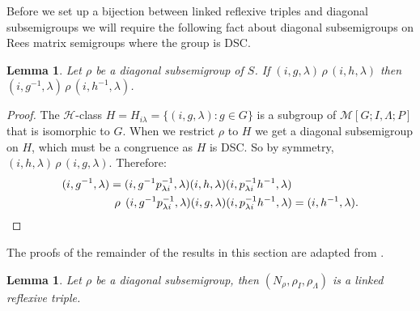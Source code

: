 \documentclass[a4paper, 12pt,reqno]{amsart}
\theoremstyle{plain}
\newtheorem{lemma}[thm]{Lemma}
\theoremstyle{definition}
\theoremstyle{remark}
\newcommand{\RM}{\mathcal{M}[G;I,\Lambda;P]}
\newcommand{\normspace}[1]{\, #1 \,}
\newcommand{\bigspace}[1]{\hspace{4.5pt} #1 \hspace{4.5pt}}
\begin{document}
Before we set up a bijection between linked reflexive triples and diagonal subsemigroups we will require the following fact about diagonal subsemigroups on Rees matrix semigroups where the group is DSC.

\begin{lemma}
    \label{Use of DSC}
    Let $\rho$ be a diagonal subsemigroup of $S$.
    If $(i,g,\lambda) \normspace{\rho} (i,h,\lambda)$ then $(i,g^{-1},\lambda) \normspace{\rho} (i,h^{-1},\lambda)$.
\end{lemma}

\begin{proof}
    The $\mathcal{H}$-class $H = H_{i\lambda} = \{ (i,g,\lambda):g\in G\}$ is a subgroup of $\RM$ that is isomorphic to $G$.
    When we restrict $\rho$ to $H$ we get a diagonal subsemigroup on $H$, which must be a congruence as $H$ is DSC.
    So by symmetry, $(i,h,\lambda) \normspace{\rho} (i,g,\lambda)$.
    Therefore:
    \begin{align*}
        (i,g^{-1},\lambda) & = (i,g^{-1} p_{\lambda i}^{-1},\lambda)(i,h,\lambda)(i,p_{\lambda i}^{-1}h^{-1},\lambda) \\
        & \bigspace{\rho} (i,g^{-1} p_{\lambda i}^{-1},\lambda)(i,g,\lambda)(i,p_{\lambda i}^{-1}h^{-1},\lambda) = (i,h^{-1},\lambda). \qedhere
    \end{align*}
\end{proof}

The proofs of the remainder of the results in this section are adapted from \cite[Section 3.5]{Ho95}.

\begin{lemma}
    Let $\rho$ be a diagonal subsemigroup, then $(N_\rho , \rho_I , \rho_\Lambda)$ is a linked reflexive triple.
\end{lemma}
\end{document}
